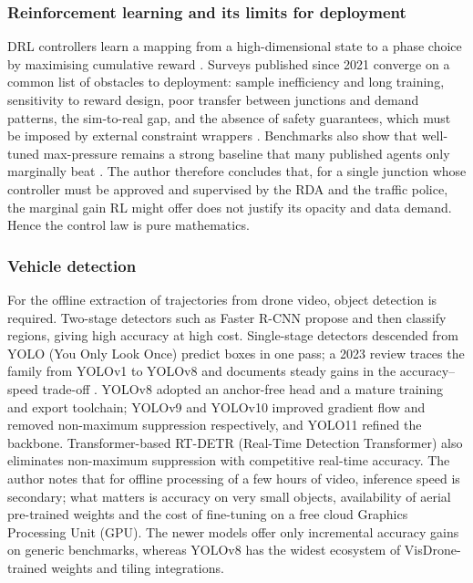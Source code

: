 \subsubsection{Reinforcement learning and its limits for deployment}
DRL controllers learn a mapping from a high-dimensional state to a phase choice by maximising cumulative reward
\cite{genders2016drl,wei2018intellilight}. Surveys published since 2021 converge on a common list of obstacles to
deployment: sample inefficiency and long training, sensitivity to reward design, poor transfer between
junctions and demand patterns, the sim-to-real gap, and the absence of safety guarantees, which must be imposed
by external constraint wrappers \cite{wei2021recent,haydari2022deep,noaeen2022rl,xiao2025advances}. Benchmarks also
show that well-tuned max-pressure remains a strong baseline that many published agents only marginally beat
\cite{wei2019survey,zhang2022expression}. The author therefore concludes that, for a single junction whose
controller must be approved and supervised by the RDA and the traffic police, the marginal gain RL might offer does not justify
its opacity and data demand. Hence the \prism{} control law is pure mathematics.

\subsubsection{Vehicle detection}
For the offline extraction of trajectories from drone video, object detection is required. Two-stage detectors
such as Faster R-CNN \cite{ren2015faster} propose and then classify regions, giving high accuracy at high cost.
Single-stage detectors descended from YOLO (You Only Look Once) \cite{redmon2016yolo} predict boxes in one pass;
a 2023 review traces the family from YOLOv1 to YOLOv8 and documents steady gains in the accuracy--speed trade-off
\cite{terven2023comprehensive}. YOLOv8 \cite{jocher2023yolov8} adopted an anchor-free head and a mature training
and export toolchain; YOLOv9 \cite{wang2024yolov9} and YOLOv10 \cite{wang2024yolov10} improved gradient flow and
removed non-maximum suppression respectively, and YOLO11 \cite{khanam2024yolov11} refined the backbone.
Transformer-based RT-DETR (Real-Time Detection Transformer) \cite{zhao2024rtdetr} also eliminates
non-maximum suppression with competitive real-time accuracy. The author notes that for offline processing of a
few hours of video, inference speed is secondary; what matters is accuracy on very small objects, availability
of aerial pre-trained weights and the cost of fine-tuning on a free cloud Graphics Processing Unit (GPU). The newer models offer only
incremental accuracy gains on generic benchmarks, whereas YOLOv8 has the widest ecosystem of VisDrone-trained
weights and tiling integrations.

